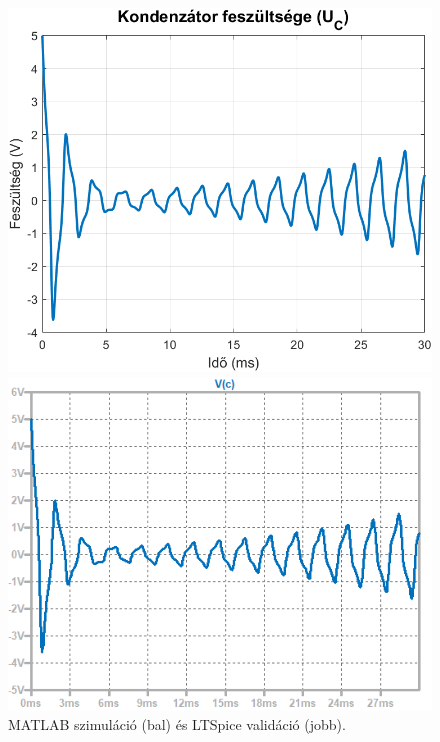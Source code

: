 \documentclass[12pt,a4paper]{article}
\begin{document}
\begin{figure}[H]
    \centering
    \begin{minipage}{0.5\textwidth}
        \centering
        \includegraphics[width=\textwidth]{figures/2.png}
    \end{minipage}%
    \begin{minipage}{0.5\textwidth}
        \centering
        \includegraphics[width=\textwidth]{figures/2ltspice.png}
    \end{minipage}
    \caption{MATLAB szimuláció (bal) és LTSpice validáció (jobb).}
    \label{fig:validation}
\end{figure}

\newpage
\listoffigures


\end{document}

